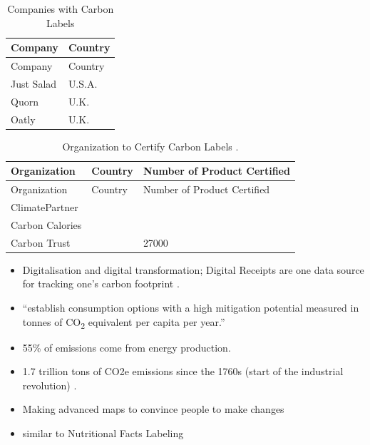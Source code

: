 \documentclass[
  letterpaper,
  DIV=11,
  numbers=noendperiod]{scrartcl}
\begin{document}
\begin{longtable}[]{@{}ll@{}}
\caption{Companies with Carbon Labels
\citep{briankatemanCarbonLabelsAre2020}}\tabularnewline
\toprule\noalign{}
Company & Country \\
\midrule\noalign{}
\endfirsthead
\toprule\noalign{}
Company & Country \\
\midrule\noalign{}
\endhead
\bottomrule\noalign{}
\endlastfoot
Just Salad & U.S.A. \\
Quorn & U.K. \\
Oatly & U.K. \\
\end{longtable}

\begin{longtable}[]{@{}lll@{}}
\caption{Organization to Certify Carbon Labels
\citep{climatepartnerLabellingCarbonFootprint2020}.}\tabularnewline
\toprule\noalign{}
Organization & Country & Number of Product Certified \\
\midrule\noalign{}
\endfirsthead
\toprule\noalign{}
Organization & Country & Number of Product Certified \\
\midrule\noalign{}
\endhead
\bottomrule\noalign{}
\endlastfoot
ClimatePartner & & \\
Carbon Calories & & \\
Carbon Trust & & 27000 \\
\end{longtable}

\begin{itemize}
\item
  Digitalisation and digital transformation; Digital Receipts are one
  data source for tracking one's carbon footprint
  \citep{DigitalReceiptsCustomer}.
\item
  \citet{ivanovaQuantifyingPotentialClimate2020} ``establish consumption
  options with a high mitigation potential measured in tonnes of
  CO\textsubscript{2} equivalent per capita per year.''
\item
  55\% of emissions come from energy production.
\item
  1.7 trillion tons of CO2e emissions since the 1760s (start of the
  industrial revolution)
  \citep{globalcarbonbudgetCumulativeCOEmissions2023, marvelOpinionClimateScientist2023}.
\item
  \citet{cartoClimateResilienceGeography2023} Making advanced maps to
  convince people to make changes
\item
  similar to Nutritional Facts Labeling
\end{itemize}
\end{document}
